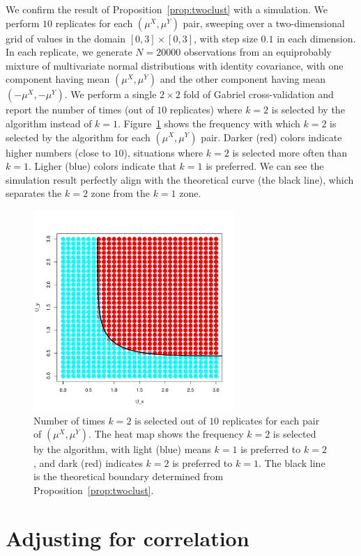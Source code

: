 \documentclass[12pt]{article}
\newcommand{\muX}{\mu^{X}}
\newcommand{\muY}{\mu^{Y}}
\begin{document}
We confirm the result of Proposition~\ref{prop:twoclust} with a simulation.
We perform $10$ replicates for each $(\mu^X, \mu^Y)$ pair, sweeping over
a two-dimensional grid of values in the domain $[0,3] \times [0,3]$, with step
size $0.1$ in each dimension.  In each
replicate, we generate $N=20000$ observations from an equiprobably mixture
of multivariate normal distributions with identity covariance, with one
component having mean $(\muX, \muY)$ and
the other component having mean $(-\muX, -\muY)$. We perform a single $2 \times 2$
fold of Gabriel cross-validation and report the number of times
(out of $10$ replicates) where $k=2$ is selected by the algorithm instead of $k=1$.
Figure~\ref{fig:overlap-color_plot} shows the frequency with which $k=2$ is selected by
the algorithm for each $(\mu^X, \mu^Y)$ pair. Darker (red) colors indicate
higher numbers (close to $10$), situations where $k = 2$ is selected more
often than $k = 1$. Ligher (blue) colors indicate that $k = 1$ is preferred.
We can see the simulation result perfectly align with the
theoretical curve (the black line), which separates the $k=2$ zone from the
$k=1$ zone.

\begin{figure}
\centering
\includegraphics[width=3in]{demo/overlap/color_plot.pdf}
\caption{Number of times $k=2$ is selected out of $10$ replicates for each
pair of $(\muX, \muY)$. The heat map shows the frequency $k=2$ is selected by
the algorithm, with light (blue) means $k = 1$ is preferred to $k = 2$, and
dark (red) indicates $k = 2$ is preferred to $k = 1$.
The black line is the theoretical boundary determined from
Proposition~\ref{prop:twoclust}.}
\label{fig:overlap-color_plot}
\end{figure}


\section{Adjusting for correlation}
\label{sec:corr-correct}
\end{document}
